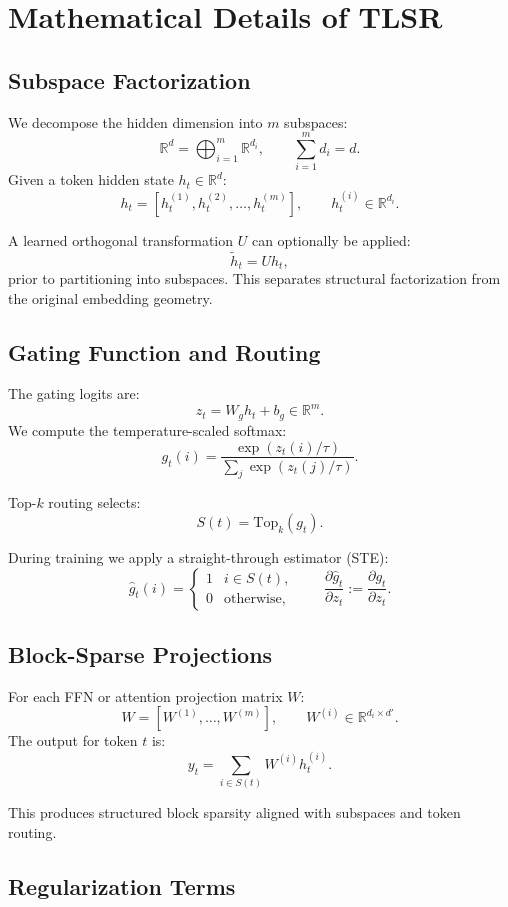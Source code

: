 \documentclass{article}
\theoremstyle{plain}
\theoremstyle{definition}
\theoremstyle{remark}
\begin{document}
\section{Mathematical Details of TLSR}

\subsection{Subspace Factorization}
We decompose the hidden dimension into $m$ subspaces:
\[
\mathbb{R}^d = \bigoplus_{i=1}^{m}\mathbb{R}^{d_i},
\qquad \sum_{i=1}^{m} d_i = d.
\]
Given a token hidden state $h_t\in\mathbb{R}^d$:
\[
h_t = [h_t^{(1)}, h_t^{(2)}, \dots, h_t^{(m)}],
\qquad h_t^{(i)}\in\mathbb{R}^{d_i}.
\]

A learned orthogonal transformation $U$ can optionally be applied:
\[
\tilde{h}_t = Uh_t,
\]
prior to partitioning into subspaces.  
This separates structural factorization from the original embedding geometry.

\subsection{Gating Function and Routing}
The gating logits are:
\[
z_t = W_g h_t + b_g \in \mathbb{R}^m.
\]
We compute the temperature-scaled softmax:
\[
g_t(i) = 
\frac{\exp(z_t(i)/\tau)}
     {\sum_j \exp(z_t(j)/\tau)}.
\]

Top-$k$ routing selects:
\[
S(t) = \mathrm{Top}_k(g_t).
\]

During training we apply a straight-through estimator (STE):
\[
\hat{g}_t(i)=
\begin{cases}
1 & i\in S(t), \\
0 & \text{otherwise},
\end{cases}
\qquad
\frac{\partial \hat{g}_t}{\partial z_t}:=
\frac{\partial g_t}{\partial z_t}.
\]

\subsection{Block-Sparse Projections}
For each FFN or attention projection matrix $W$:
\[
W = [W^{(1)},\dots,W^{(m)}],
\qquad 
W^{(i)}\in\mathbb{R}^{d_i\times d'}.
\]
The output for token $t$ is:
\[
y_t = 
\sum_{i\in S(t)} 
W^{(i)} h_t^{(i)}.
\]

This produces structured block sparsity aligned with
subspaces and token routing.

\subsection{Regularization Terms}
\end{document}
